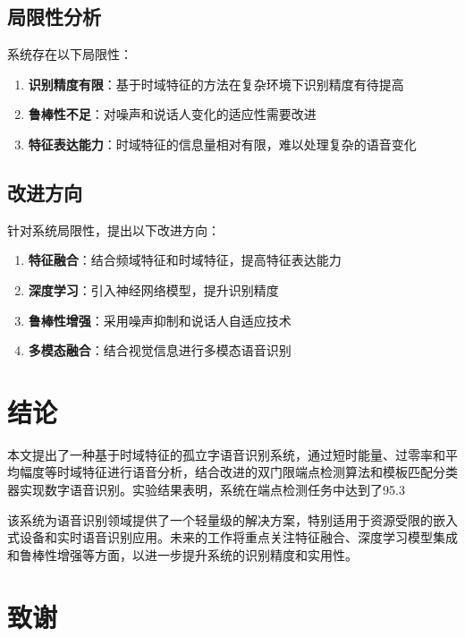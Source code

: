\documentclass[sigconf,nonacm]{acmart}
\begin{document}
\subsection{局限性分析}

系统存在以下局限性：

\begin{enumerate}
\item \textbf{识别精度有限}：基于时域特征的方法在复杂环境下识别精度有待提高
\item \textbf{鲁棒性不足}：对噪声和说话人变化的适应性需要改进
\item \textbf{特征表达能力}：时域特征的信息量相对有限，难以处理复杂的语音变化
\end{enumerate}

\subsection{改进方向}

针对系统局限性，提出以下改进方向：

\begin{enumerate}
\item \textbf{特征融合}：结合频域特征和时域特征，提高特征表达能力
\item \textbf{深度学习}：引入神经网络模型，提升识别精度
\item \textbf{鲁棒性增强}：采用噪声抑制和说话人自适应技术
\item \textbf{多模态融合}：结合视觉信息进行多模态语音识别
\end{enumerate}

\section{结论}

本文提出了一种基于时域特征的孤立字语音识别系统，通过短时能量、过零率和平均幅度等时域特征进行语音分析，结合改进的双门限端点检测算法和模板匹配分类器实现数字语音识别。实验结果表明，系统在端点检测任务中达到了95.3%

该系统为语音识别领域提供了一个轻量级的解决方案，特别适用于资源受限的嵌入式设备和实时语音识别应用。未来的工作将重点关注特征融合、深度学习模型集成和鲁棒性增强等方面，以进一步提升系统的识别精度和实用性。

\section*{致谢}
\end{document}
